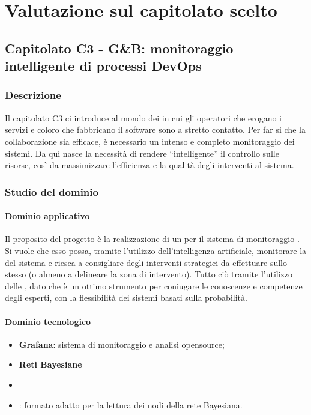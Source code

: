 \section{Valutazione sul capitolato scelto}
	\subsection{Capitolato C3 - G\&B: monitoraggio intelligente di processi DevOps}
	
		\subsubsection{Descrizione}
		Il capitolato C3 ci introduce al mondo dei  in cui gli operatori che erogano i servizi e coloro che fabbricano il software sono a stretto contatto. Per far si che la collaborazione sia efficace, è necessario un intenso e completo monitoraggio dei sistemi. Da qui nasce la necessità di rendere “intelligente” il controllo sulle risorse, così da massimizzare l’efficienza e la qualità degli interventi al sistema.

	\subsubsection{Studio del dominio}
		\paragraph{Dominio applicativo} \Spazio
		Il proposito del progetto è la realizzazione di un  per il sistema di monitoraggio . Si vuole che esso possa, tramite l’utilizzo dell’intelligenza artificiale, monitorare la  del sistema e riesca a consigliare degli interventi strategici da effettuare sullo stesso (o almeno a delineare la zona di intervento). Tutto ciò tramite l’utilizzo delle , dato che è un ottimo strumento per coniugare le conoscenze e competenze degli esperti, con la flessibilità dei sistemi basati sulla probabilità.
		\paragraph{Dominio tecnologico}
		\begin{itemize}
		\item\textbf{{Grafana}}: sistema di monitoraggio e analisi opensource;
		\item\textbf{{Reti Bayesiane}} 
		\item\textbf{{}}
		\item\textbf{{}}: formato adatto per la lettura dei nodi della rete Bayesiana.
		\end{itemize}
	
